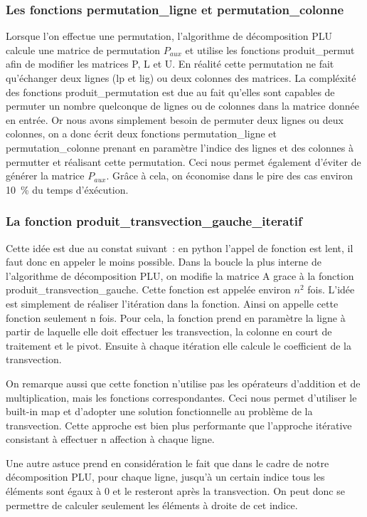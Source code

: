 \documentclass[11pt]{article}
\begin{document}
\subsubsection{Les fonctions permutation\_ligne et permutation\_colonne}
Lorsque l'on effectue une permutation, l'algorithme de décomposition PLU calcule une matrice de permutation $P_{aux}$ et utilise les fonctions produit\_permut afin de modifier les matrices P, L et U. En réalité cette permutation ne fait qu'échanger deux lignes (lp et lig) ou deux colonnes des matrices. La compléxité des fonctions produit\_permutation est due au fait qu'elles sont capables de permuter un nombre quelconque de lignes ou de colonnes dans la matrice donnée en entrée. Or nous avons simplement besoin de permuter deux lignes ou deux colonnes, on a donc écrit deux fonctions permutation\_ligne et permutation\_colonne prenant en paramètre l'indice des lignes et des colonnes à permutter et réalisant cette permutation. Ceci nous permet également d'éviter de générer la matrice $P_{aux}$. Grâce à cela, on économise dans le pire des cas environ 10 \% du temps d'éxécution.

\subsubsection{La fonction produit\_transvection\_gauche\_iteratif}
Cette idée est due au constat suivant : en python l'appel de fonction est lent, il faut donc en appeler le moins possible. Dans la boucle la plus interne de l'algorithme de décomposition PLU, on modifie la matrice A grace à la fonction produit\_transvection\_gauche. Cette fonction est appelée environ $n^2$  fois. L'idée est simplement de réaliser l'itération dans la fonction. Ainsi on appelle cette fonction seulement n fois. Pour cela, la fonction prend en paramètre la ligne à partir de laquelle elle doit effectuer les transvection, la colonne en court de traitement et le pivot. Ensuite à chaque itération elle calcule le coefficient de la transvection. 

On remarque aussi que cette fonction n'utilise pas les opérateurs d'addition et de multiplication, mais les fonctions correspondantes. Ceci nous permet d'utiliser le built-in map et d'adopter une solution fonctionnelle au problème de la transvection. Cette approche est bien plus performante que l'approche itérative consistant à effectuer n affection à chaque ligne.

Une autre astuce prend en considération le fait que dans le cadre de notre décomposition PLU, pour chaque ligne, jusqu'à un certain indice tous les éléments sont égaux à 0 et le resteront après la transvection. On peut donc se permettre de calculer seulement les éléments à droite de cet indice.
\end{document}
